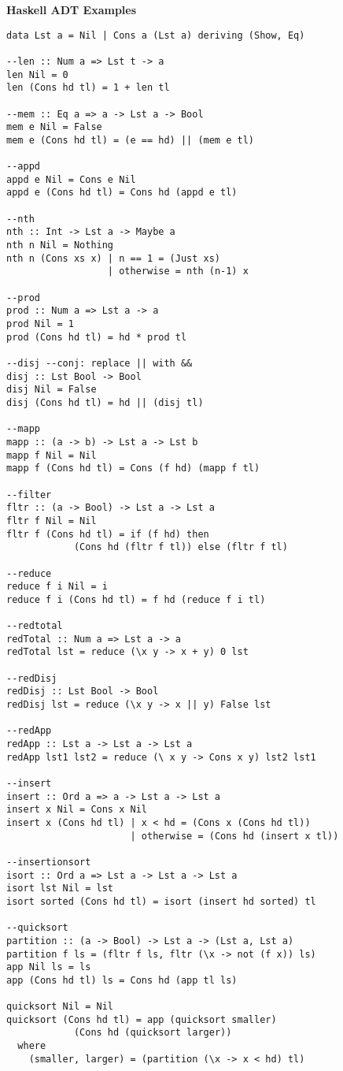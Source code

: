 \begin{breakbox}
\textbf{Haskell ADT Examples}
\begin{verbatim}
data Lst a = Nil | Cons a (Lst a) deriving (Show, Eq)

--len :: Num a => Lst t -> a
len Nil = 0
len (Cons hd tl) = 1 + len tl

--mem :: Eq a => a -> Lst a -> Bool
mem e Nil = False
mem e (Cons hd tl) = (e == hd) || (mem e tl)

--appd
appd e Nil = Cons e Nil
appd e (Cons hd tl) = Cons hd (appd e tl)

--nth
nth :: Int -> Lst a -> Maybe a
nth n Nil = Nothing
nth n (Cons xs x) | n == 1 = (Just xs)
                  | otherwise = nth (n-1) x

--prod
prod :: Num a => Lst a -> a
prod Nil = 1
prod (Cons hd tl) = hd * prod tl

--disj --conj: replace || with &&
disj :: Lst Bool -> Bool
disj Nil = False
disj (Cons hd tl) = hd || (disj tl)

--mapp
mapp :: (a -> b) -> Lst a -> Lst b
mapp f Nil = Nil
mapp f (Cons hd tl) = Cons (f hd) (mapp f tl)

--filter
fltr :: (a -> Bool) -> Lst a -> Lst a
fltr f Nil = Nil
fltr f (Cons hd tl) = if (f hd) then 
			(Cons hd (fltr f tl)) else (fltr f tl)

--reduce 
reduce f i Nil = i
reduce f i (Cons hd tl) = f hd (reduce f i tl)

--redtotal
redTotal :: Num a => Lst a -> a
redTotal lst = reduce (\x y -> x + y) 0 lst

--redDisj
redDisj :: Lst Bool -> Bool
redDisj lst = reduce (\x y -> x || y) False lst

--redApp
redApp :: Lst a -> Lst a -> Lst a
redApp lst1 lst2 = reduce (\ x y -> Cons x y) lst2 lst1

--insert
insert :: Ord a => a -> Lst a -> Lst a
insert x Nil = Cons x Nil
insert x (Cons hd tl) | x < hd = (Cons x (Cons hd tl))
                      | otherwise = (Cons hd (insert x tl))

--insertionsort
isort :: Ord a => Lst a -> Lst a -> Lst a
isort lst Nil = lst
isort sorted (Cons hd tl) = isort (insert hd sorted) tl

--quicksort
partition :: (a -> Bool) -> Lst a -> (Lst a, Lst a)
partition f ls = (fltr f ls, fltr (\x -> not (f x)) ls)
app Nil ls = ls
app (Cons hd tl) ls = Cons hd (app tl ls)

quicksort Nil = Nil
quicksort (Cons hd tl) = app (quicksort smaller) 
			(Cons hd (quicksort larger))
  where
    (smaller, larger) = (partition (\x -> x < hd) tl)
\end{verbatim}
\end{breakbox}

